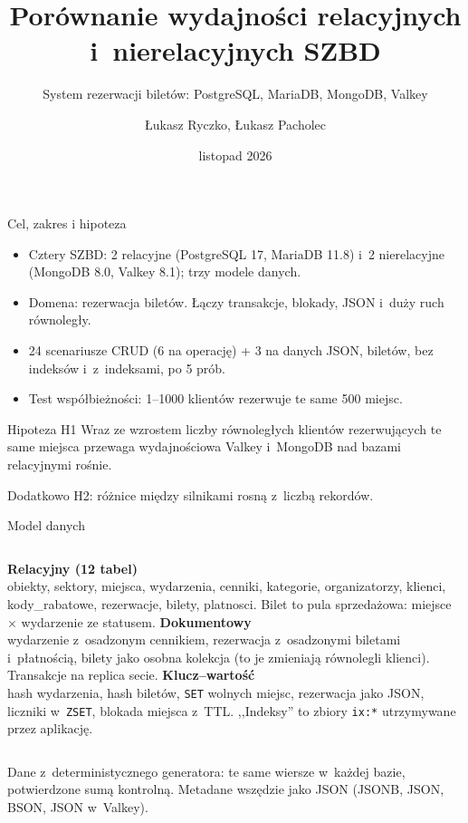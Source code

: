 \documentclass[aspectratio=169,11pt]{beamer}
\title{Porównanie wydajności relacyjnych i~nierelacyjnych SZBD}
\subtitle{System rezerwacji biletów: PostgreSQL, MariaDB, MongoDB, Valkey}
\author{Łukasz Ryczko, Łukasz Pacholec}
\institute{Zaawansowane technologie baz danych · Politechnika Krakowska}
\date{listopad 2026}
\begin{document}
\begin{frame}
  \titlepage
\end{frame}

\begin{frame}{Cel, zakres i hipoteza}
  \begin{itemize}
    \item Cztery SZBD: 2 relacyjne (PostgreSQL 17, MariaDB 11.8) i~2 nierelacyjne
      (MongoDB 8.0, Valkey 8.1); trzy modele danych.
    \item Domena: rezerwacja biletów. Łączy transakcje, blokady, JSON i~duży
      ruch równoległy.
    \item 24 scenariusze CRUD (6 na operację) + 3 na danych JSON,
      \SizesList{} biletów, bez indeksów i~z~indeksami, po 5 prób.
    \item Test współbieżności: 1--1000 klientów rezerwuje te same 500 miejsc.
  \end{itemize}
  \vspace{2mm}
  \begin{block}{Hipoteza H1}
    Wraz ze wzrostem liczby równoległych klientów rezerwujących te same miejsca
    przewaga wydajnościowa Valkey i~MongoDB nad bazami relacyjnymi rośnie.
  \end{block}
  {\small Dodatkowo H2: różnice między silnikami rosną z~liczbą rekordów.}
\end{frame}

\begin{frame}{Model danych}
  \begin{columns}[T]
    \textbf{Relacyjny (12 tabel)}\\[1mm]
    \small obiekty, sektory, miejsca, wydarzenia, cenniki, kategorie,
    organizatorzy, klienci, kody\_rabatowe, rezerwacje, bilety, platnosci.
    Bilet to pula sprzedażowa: miejsce × wydarzenie ze statusem.
    \textbf{Dokumentowy}\\[1mm]
    \small wydarzenie z~osadzonym cennikiem, rezerwacja z~osadzonymi biletami
    i~płatnością, bilety jako osobna kolekcja (to je zmieniają równolegli
    klienci). Transakcje na replica secie.
    \textbf{Klucz--wartość}\\[1mm]
    \small hash wydarzenia, hash biletów, \texttt{SET} wolnych miejsc,
    rezerwacja jako JSON, liczniki w~\texttt{ZSET}, blokada miejsca z~TTL.
    ,,Indeksy'' to zbiory \texttt{ix:*} utrzymywane przez aplikację.
  \end{columns}
  \vspace{4mm}
  \small Dane z~deterministycznego generatora: te same wiersze w~każdej bazie,
  potwierdzone sumą kontrolną. Metadane wszędzie jako JSON (JSONB, JSON, BSON,
  JSON w~Valkey).
\end{frame}
\end{document}
